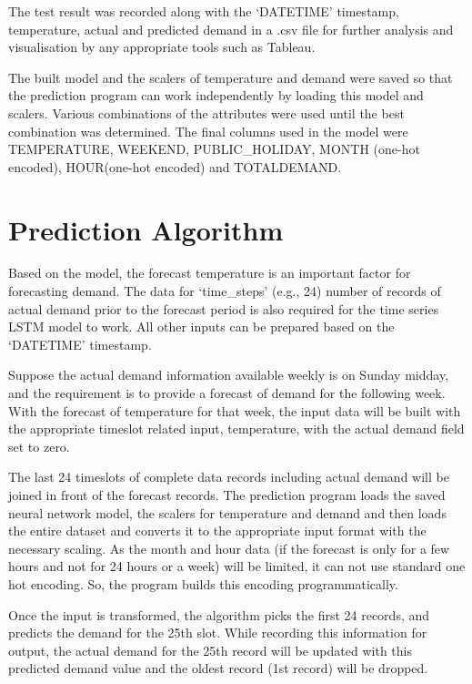 \documentclass[mstat,12pt]{unswthesis}
\begin{document}
\bigskip

The test result was recorded along with the `DATETIME' timestamp,
temperature, actual and predicted demand in a .csv file for further
analysis and visualisation by any appropriate tools such as Tableau.

\bigskip

The built model and the scalers of temperature and demand were saved so
that the prediction program can work independently by loading this model
and scalers. Various combinations of the attributes were used until the
best combination was determined. The final columns used in the model
were TEMPERATURE, WEEKEND, PUBLIC\_HOLIDAY, MONTH (one-hot encoded),
HOUR(one-hot encoded) and TOTALDEMAND.

\bigskip

\hypertarget{prediction-algorithm}{%
\section{Prediction Algorithm}\label{prediction-algorithm}}

Based on the model, the forecast temperature is an important factor for
forecasting demand. The data for `time\_steps' (e.g., 24) number of
records of actual demand prior to the forecast period is also required
for the time series LSTM model to work. All other inputs can be prepared
based on the `DATETIME' timestamp.

\bigskip

Suppose the actual demand information available weekly is on Sunday
midday, and the requirement is to provide a forecast of demand for the
following week. With the forecast of temperature for that week, the
input data will be built with the appropriate timeslot related input,
temperature, with the actual demand field set to zero.

\bigskip

The last 24 timeslots of complete data records including actual demand
will be joined in front of the forecast records. The prediction program
loads the saved neural network model, the scalers for temperature and
demand and then loads the entire dataset and converts it to the
appropriate input format with the necessary scaling. As the month and
hour data (if the forecast is only for a few hours and not for 24 hours
or a week) will be limited, it can not use standard one hot encoding.
So, the program builds this encoding programmatically.

\bigskip

Once the input is transformed, the algorithm picks the first 24 records,
and predicts the demand for the 25th slot. While recording this
information for output, the actual demand for the 25th record will be
updated with this predicted demand value and the oldest record (1st
record) will be dropped.
\end{document}
